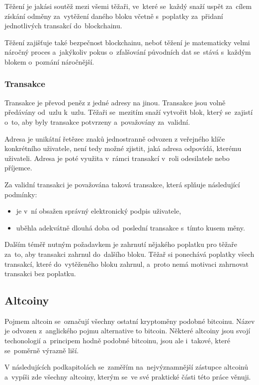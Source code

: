 \documentclass[thesis=B,czech]{FITthesis}[2019/03/21]
\begin{document}
Těžení je jakási soutěž mezi všemi těžaři, ve~které se~každý snaží uspět za~cílem získání odměny za~vytěžení daného bloku včetně s~poplatky za~přidaní jednotlivých transakcí do~blockchainu.

Těžení zajišťuje také bezpečnost blockchainu, neboť těžení je matematicky velmi náročný proces a~jakýkoliv pokus o~zfalšování původních dat se~stává s~každým blokem o~poznání náročnější. \cite{mastering_bitcoin}

\subsubsection{Transakce}
Transakce je převod peněz z jedné adresy na jinou. Transakce jsou volně předávány od~uzlu k~uzlu. Těžaři se~mezitím snaží vytvořit blok, který se~zajistí o~to, aby byly transakce potvrzeny a~považovány za~validní.

Adresa je unikátní řetězec znaků jednostranně odvozen z veřejného klíče konkrétního uživatele, není tedy možné zjistit, jaká adresa odpovídá, kterému uživateli. Adresa je poté využita v~rámci transakcí v~roli odesilatele nebo příjemce. \cite{mastering_bitcoin}

Za validní transakci je považována taková transakce, která splňuje \linebreak následující podmínky:
\begin{itemize}
    \item je v~ní obsažen správný elektronický podpis uživatele,
    \item uběhla adekvátně dlouhá doba od~poslední transakce s~tímto kusem měny. \cite{Finex_blockchain}
\end{itemize}
Dalším téměř nutným požadavkem je zahrnutí nějakého poplatku pro těžaře za~to, aby transakci zahrnul do~dalšího bloku. Těžař si ponechává poplatky všech transakcí, které do~vytěženého bloku zahrnul, a~proto nemá motivaci zahrnovat transakci bez poplatku. \cite{Finex_blockchain}

\subsection{Altcoiny}
Pojmem altcoin se~označují všechny ostatní kryptoměny podobné bitcoinu. Název je odvozen z~anglického pojmu alternative to bitcoin. Některé altcoiny jsou svojí techonologií a~principem hodně podobné bitcoinu, jsou ale i~takové, které se~poměrně výrazně liší. \cite{altcoin}

V následujících podkapitolách se~zaměřím na~nejvýznamnější zástupce altcoinů a~vypíši zde všechny altcoiny, kterým se~ve své praktické části této práce věnuji.
\end{document}

